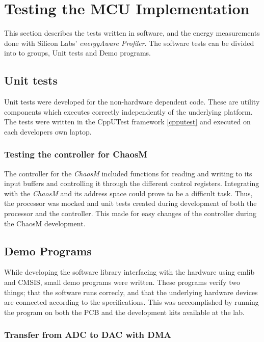 \section{Testing the MCU Implementation}

This section describes the tests written in software, and the energy measurements
done with Silicon Labs' \textit{energyAware Profiler}. The software tests can be
divided into to groups, Unit tests and Demo programs.

\subsection{Unit tests}

Unit tests were developed for the non-hardware dependent code. These are
utility components which executes correctly independently of the underlying
platform. The tests were written in the CppUTest framework \ref{cpputest} and executed
on each developers own laptop.

\subsubsection{Testing the controller for ChaosM}
The controller for the \textit{ChaosM} included functions for reading and writing
to its input buffers and controlling it through the different control registers.
Integrating with the \textit{ChaosM} and its address space could prove to be a
difficult task. Thus, the processor was mocked and unit tests created during 
development of both the processor and the controller.
This made for easy changes of the controller during the ChaosM development.

\subsection{Demo Programs}

While developing the software library interfacing with the hardware using emlib
and CMSIS, small demo programs were written. These programs verify two things;
that the software runs correcly, and that the underlying hardware devices are
connected according to the specifications. This was acccomplished by running the
program on both the PCB and the development kits available at the lab.

\subsubsection{Transfer from ADC to DAC with DMA}
